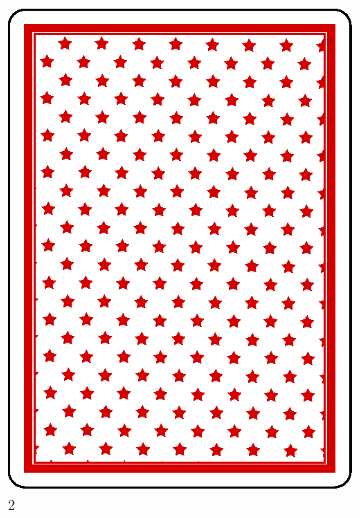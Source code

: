 \documentclass[10pt]{beamer}
\begin{document}
\begin{frame}
\begin{columns}
\begin{column}{7cm}
\begin{figure}
\begin{subfigure}{.15\linewidth}
      \includegraphics[width=\linewidth]{im/back.eps}
      \caption{2}
     \end{subfigure}
     \begin{subfigure}{.15\linewidth}

\end{subfigure}
\end{figure}
\end{column}
\end{columns}
\end{frame}
\end{document}
